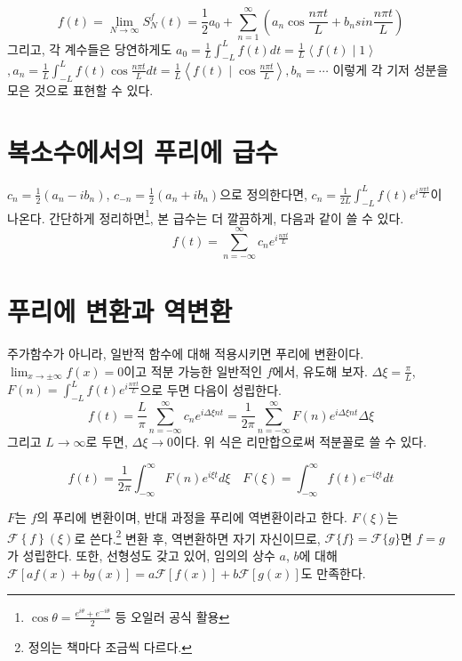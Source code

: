\documentclass[article, oneside]{oblivoir}
\begin{document}
\begin{equation}
    f(t) = \lim_{N \to \infty} S_N^f (t) = \frac{1}{2} a_0 + \sum_{n=1}^{\infty} \left( a_n \cos \frac{n \pi t}{L} + b_n sin \frac{n \pi t}{L}\right)
\end{equation}
그리고, 각 계수들은 당연하게도
$a_0 = \frac{1}{L} \int_{-L}^{L} f(t)dt
= \frac{1}{L} \left\langle f(t) \mid 1\right\rangle$$
, a_n = \frac{1}{L} \int_{-L}^{L} f(t) \cos\frac{n \pi t}{L}dt 
=\frac{1}{L} \left\langle f(t) \mid \cos\frac{n \pi t}{L}\right\rangle, b_n = \cdots$ 이렇게 각 기저 성분을 모은 것으로 표현할 수 있다.

\section{복소수에서의 푸리에 급수}
$c_n = \frac{1}{2}\left(a_n - ib_n\right)$, $c_{-n} = \frac{1}{2}\left(a_n + ib_n\right)$으로 정의한다면, $c_n = \frac{1}{2L}\int_{-L}^{L} f(t)e^{i\frac{n \pi t}{L}}$이 나온다. 간단하게 정리하면\footnote{$\cos \theta = \frac{e^{i \theta} + e^{-i \theta}}{2}$ 등 오일러 공식 활용}, 본 급수는 더 깔끔하게, 다음과 같이 쓸 수 있다.
\begin{equation}
    f(t) = \sum_{n=-\infty}^{\infty} c_n e^{i \frac{n \pi t}{L}}
\end{equation}

\section{푸리에 변환과 역변환}

주가함수가 아니라, 일반적 함수에 대해 적용시키면 푸리에 변환이다. $\lim_{x \to \pm \infty}f(x)=0$이고 적분 가능한 일반적인 $f$에서, 유도해 보자.
$\Delta \xi = \frac{\pi}{L}$, $F(n) = \int_{-L}^{L} f(t)e^{i\frac{n \pi t}{L}}$으로 두면 다음이 성립한다. 
$$f(t) = \frac{L}{\pi} \sum_{n=-\infty}^{\infty} c_n e^{i \Delta \xi n t} = \frac{1}{2\pi} \sum_{n=-\infty}^{\infty} F(n) e^{i  \Delta \xi n t} \Delta \xi$$
그리고 $L \to \infty$로 두면, $\Delta \xi \to 0$이다. 위 식은 리만합으로써 적분꼴로 쓸 수 있다.

\begin{equation}
    f(t) = \frac{1}{2\pi} \int_{-\infty}^{\infty} F(n) e^{i \xi t}d\xi \quad F(\xi) = \int_{-\infty}^{\infty} f(t)e^{-i \xi t}dt
\end{equation}

$F$는 $f$의 푸리에 변환이며, 반대 과정을 푸리에 역변환이라고 한다. $F(\xi)$는 $\mathcal{F}\left\{f\right\}(\xi)$로 쓴다.\footnote{정의는 책마다 조금씩 다르다.} 변환 후, 역변환하면 자기 자신이므로, $\mathcal{F}\{f\} = \mathcal{F}\{g\}$면 $f=g$가 성립한다.
또한, 선형성도 갖고 있어, 임의의 상수 $a$, $b$에 대해 $\mathcal{F} \left[af(x)+bg(x)\right]=a\mathcal{F} \left[f(x)\right]+b\mathcal{F} \left[g(x)\right]$도 만족한다.
\end{document}
